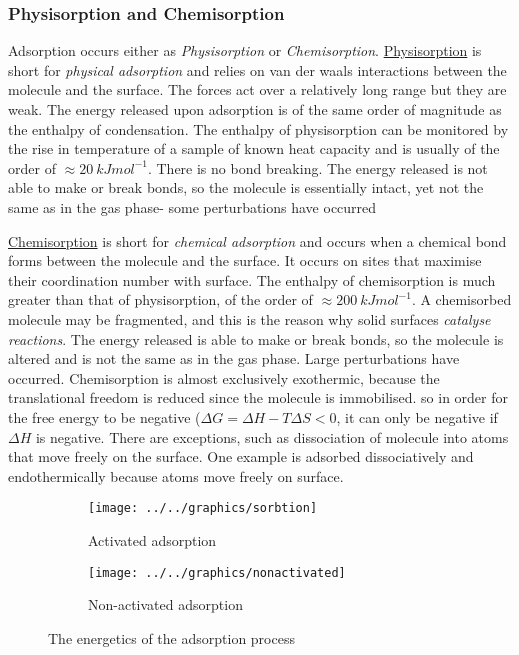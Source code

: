 \documentclass[ignorenonframetext]{beamer}
\begin{document}
\subsubsection{Physisorption and Chemisorption}

Adsorption occurs either as \textit{Physisorption} or \textit{Chemisorption}. \underline{Physisorption} is short for \textit{physical adsorption} and relies on van der waals interactions between the molecule and the surface. The forces act over a relatively long range but they are weak. The energy released upon adsorption is of the same order of magnitude as the enthalpy of condensation. The enthalpy of physisorption can be monitored by the rise in temperature of a sample of known heat capacity and is usually of the order of \(\approx 20\ kJmol^{-1}\). There is no bond breaking. The energy released is not able to make or break bonds, so the molecule is essentially intact, yet not the same as in the gas phase- some perturbations have occurred


\underline{Chemisorption} is short for \textit{chemical adsorption} and occurs when a chemical bond forms between the molecule and the surface. It occurs on sites that maximise their coordination number with surface. The enthalpy of chemisorption is much greater than that of physisorption, of the order of \(\approx 200\ kJmol^{-1}\). A chemisorbed molecule may be fragmented, and this is the reason why solid surfaces \textit{catalyse reactions}. The energy released is able to make or break bonds, so the molecule is altered and is not the same as in the gas phase. Large perturbations have occurred.
 Chemisorption is almost exclusively exothermic, because the translational freedom is reduced since the molecule is immobilised. so in order for the free energy to be negative (\(\Delta G = \Delta H - T\Delta S <0\), it can only be negative if \(\Delta H\) is negative. There are exceptions, such as dissociation of molecule into atoms that move freely on the surface. One example is  adsorbed dissociatively and endothermically because  atoms move freely on surface.

\begin{figure}[H]
\centering
     \begin{subfigure}[b]{0.4\textwidth}
         \centering
         \texttt{[image: ../../graphics/sorbtion]}
         \caption{Activated adsorption}
     \end{subfigure}
     \hfill
     \begin{subfigure}[b]{0.55\textwidth}
         \centering
         \texttt{[image: ../../graphics/nonactivated]}
         \caption{Non-activated adsorption}
     \end{subfigure}
     \label{fig:activated}
     \caption{The energetics of the adsorption process}
\end{figure}
\end{document}
